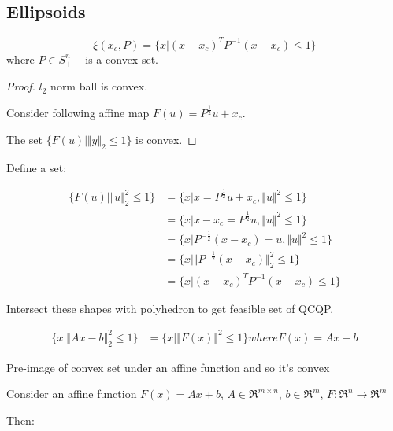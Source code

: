 \subsection{Ellipsoids}

\begin{equation*}
\xi(x_c, P) =\{x|(x - x_c)^TP^{-1}(x - x_c) \leq 1 \}
\end{equation*}
where $P\in S^n_{++}$   is a convex set.

\begin{proof}
	
	$l_2$ norm ball is convex. 
	
	Consider following affine map $F(u) = P^{\frac{1}{2}}u + x_c$.
	
	The set $\{F(u) | \Vert y\Vert_2 \leq 1 \}$ is convex. 
\end{proof}

Define a set:

\begin{align*}
\{F(u) | \Vert u\Vert^2_2 \leq 1 \} &= \{x|x = P^{\frac{1}{2}}u+x_c, \Vert u\Vert^2 \leq 1 \}\\
&= \{x|x - x_c = P^{\frac{1}{2}}u, \Vert u\Vert^2 \leq 1 \}\\
&= \{x|P^{-\frac{1}{2}}(x - x_c) =u, \Vert u\Vert^2 \leq 1 \}\\
&= \{x|\Vert P^{-\frac{1}{2}}(x - x_c)\Vert^2_2 \leq 1 \}\\
&= \{x|(x - x_c)^TP^{-1}(x - x_c) \leq 1 \}
\end{align*}

Intersect these shapes with polyhedron to get feasible set of QCQP.

\begin{example}
	\begin{align*}
	\{x | \Vert Ax - b \Vert^2_2 \leq 1 \} &= \{x | \Vert F(x) \Vert^2 \leq 1 \}  where F(x) = Ax - b
	\end{align*}
	
	Pre-image of convex set under an affine function and so it's convex
\end{example}




Consider an affine function $F(x) = Ax + b$, $A\in \Re^{m\times n}$, $b\in \Re^m$, $F:\Re^n \rightarrow \Re^m$

Then:

